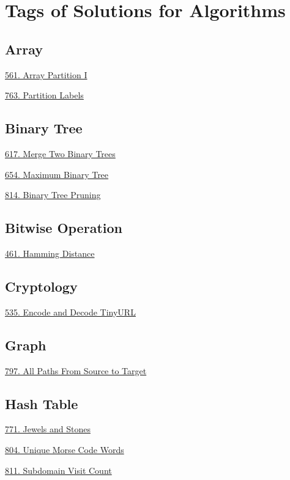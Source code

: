 \tocless\section{Tags of Solutions for Algorithms}
\label{sec:algo_tag}

\subsection*{Array}
\begin{flushleft}
    \hyperref[algo:561]{561. Array Partition I}

    \hyperref[algo:763]{763. Partition Labels}
\end{flushleft}

\subsection*{Binary Tree}
\begin{flushleft}
    \hyperref[algo:617]{617. Merge Two Binary Trees}

    \hyperref[algo:654]{654. Maximum Binary Tree}

    \hyperref[algo:814]{814. Binary Tree Pruning}
\end{flushleft}

\subsection*{Bitwise Operation}
\begin{flushleft}
    \hyperref[algo:461]{461. Hamming Distance}
\end{flushleft}

\subsection*{Cryptology}
\begin{flushleft}
    \hyperref[algo:535]{535. Encode and Decode TinyURL}
\end{flushleft}

\subsection*{Graph}
\begin{flushleft}
    \hyperref[algo:797]{797. All Paths From Source to Target}
\end{flushleft}

\subsection*{Hash Table}
\begin{flushleft}
    \hyperref[algo:771]{771. Jewels and Stones}
    
    \hyperref[algo:804]{804. Unique Morse Code Words}
    
    \hyperref[algo:811]{811. Subdomain Visit Count}
\end{flushleft}

